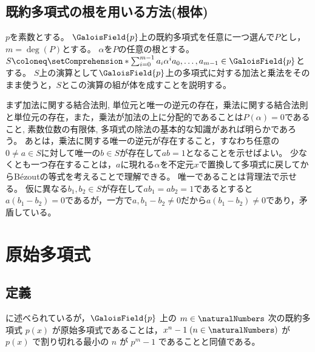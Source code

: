         \subsection{既約多項式の根を用いる方法(根体)}
            $p$を素数とする。
            $\GaloisField{p}$上の既約多項式を任意に一つ選んで$P$とし，$m = \deg(P)$とする。
            $\alpha$を$P$の任意の根とする。
            $S \coloneq \setComprehension*{\sum_{i=0}^{m-1}a_i\alpha^i}{a_0,\dotsc,a_{m-1} \in \GaloisField{p}}$とする。
            $S$上の演算として$\GaloisField{p}$上の多項式に対する加法と乗法をそのまま使うと，$S$とこの演算の組が体を成すことを説明する。
            \par
            まず加法に関する結合法則, 単位元と唯一の逆元の存在，乗法に関する結合法則と単位元の存在，また，乗法が加法の上に分配的であることは$P(\alpha) = 0$であること, 素数位数の有限体, 多項式の除法の基本的な知識があれば明らかであろう。
            あとは，乗法に関する唯一の逆元が存在すること，すなわち任意の$0 \neq a\in S$に対して唯一の$b\in S$が存在して$ab=1$となることを示せばよい。
            少なくとも一つ存在することは，$a$に現れる$\alpha$を不定元$x$で置換して多項式に戻してからB\'ezoutの等式を考えることで理解できる。
            唯一であることは背理法で示せる。
            仮に異なる$b_1,b_2 \in S$が存在して$ab_1 = ab_2 = 1$であるとすると$a(b_1 - b_2) = 0$であるが，一方で$a, b_1 - b_2 \neq 0$だから$a(b_1 - b_2) \neq 0$であり，矛盾している。
    \section{原始多項式}
        \subsection{定義}
            \cite{prim_poly_Wikipedia} に述べられているが，$\GaloisField{p}$ 上の $m\in\naturalNumbers$ 次の既約多項式 $p(x)$ が原始多項式であることは，$x^n-1\;(n\in\naturalNumbers)$ が $p(x)$ で割り切れる最小の $n$ が $p^m-1$ であることと同値である。
